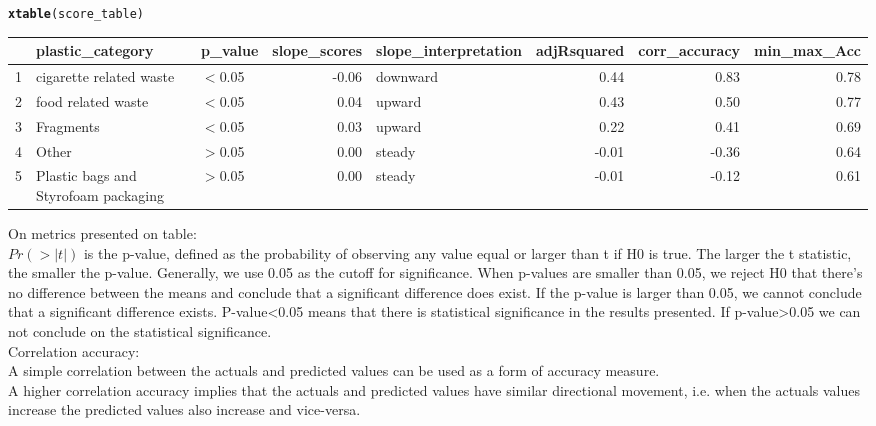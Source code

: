 \documentclass[10pt]{article}\usepackage[]{graphicx}\usepackage[]{color}
\makeatletter
\newcommand{\hlstd}[1]{\textcolor[rgb]{0.345,0.345,0.345}{#1}}%
\newcommand{\hlkwd}[1]{\textcolor[rgb]{0.737,0.353,0.396}{\textbf{#1}}}%
\newenvironment{kframe}{%
 \def\at@end@of@kframe{}%
 \ifinner\ifhmode%
  \def\at@end@of@kframe{\end{minipage}}%
  \begin{minipage}{\columnwidth}%
 \fi\fi%
 \def\FrameCommand##1{\hskip\@totalleftmargin \hskip-\fboxsep
 \colorbox{shadecolor}{##1}\hskip-\fboxsep
     \hskip-\linewidth \hskip-\@totalleftmargin \hskip\columnwidth}%
 \MakeFramed {\advance\hsize-\width
   \@totalleftmargin\z@ \linewidth\hsize
   \@setminipage}}%
 {\par\unskip\endMakeFramed%
 \at@end@of@kframe}
\makeatother
\begin{document}
\begin{kframe}
\begin{alltt}
\hlkwd{xtable}\hlstd{(score_table)}
\end{alltt}
\end{kframe}%
\begin{table}[ht]
\centering
\begin{tabular}{rllrlrrr}
  \hline
 & plastic\_category & p\_value & slope\_scores & slope\_interpretation & adjRsquared & corr\_accuracy & min\_max\_Acc \\ 
  \hline
1 & cigarette related waste & $<$0.05 & -0.06 & downward & 0.44 & 0.83 & 0.78 \\ 
  2 & food related waste & $<$0.05 & 0.04 & upward & 0.43 & 0.50 & 0.77 \\ 
  3 & Fragments & $<$0.05 & 0.03 & upward & 0.22 & 0.41 & 0.69 \\ 
  4 & Other & $>$0.05 & 0.00 & steady & -0.01 & -0.36 & 0.64 \\ 
  5 & Plastic bags and Styrofoam packaging & $>$0.05 & 0.00 & steady & -0.01 & -0.12 & 0.61 \\ 
   \hline
\end{tabular}
\end{table}



On metrics presented on table:\\

$Pr(>|t|)$ is the p-value, defined as the probability of observing any value equal or larger than t if H0 is true. The larger the t statistic, the smaller the p-value. Generally, we use 0.05 as the cutoff for significance. When p-values are smaller than 0.05, we reject H0 that there's no difference between the means and conclude that a significant difference does exist. If the p-value is larger than 0.05, we cannot conclude that a significant difference exists. P-value<0.05 means that there is statistical significance in the results presented. If p-value>0.05 we can not conclude on the statistical significance. \\

Correlation accuracy:\\
A simple correlation between the actuals and predicted values can be used as a form of accuracy measure.\\
A higher correlation accuracy implies that the actuals and predicted values have similar directional movement, i.e. when the actuals values increase the predicted values also increase and vice-versa.\\
\end{document}

